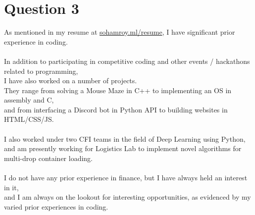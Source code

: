 \documentclass{article}
\begin{document}
\section*{Question 3}
As mentioned in my resume at \href{http://sohamroy.ml/resume/}{sohamroy.ml/resume}, I have significant prior experience in coding. \\
\\
In addition to participating in competitive coding and other events / hackathons related to programming, \\
I have also worked on a number of projects. \\
They range from solving a Mouse Maze in C++ to implementing an OS in assembly and C, \\
and from interfacing a Discord bot in Python API to building websites in HTML/CSS/JS. \\
\\
I also worked under two CFI teams in the field of Deep Learning using Python, \\
and am presently working for Logistics Lab to implement novel algorithms for multi-drop container loading. \\
\\
I do not have any prior experience in finance, but I have always held an interest in it, \\
and I am always on the lookout for interesting opportunities, as evidenced by my varied prior experiences in coding.
\end{document}
